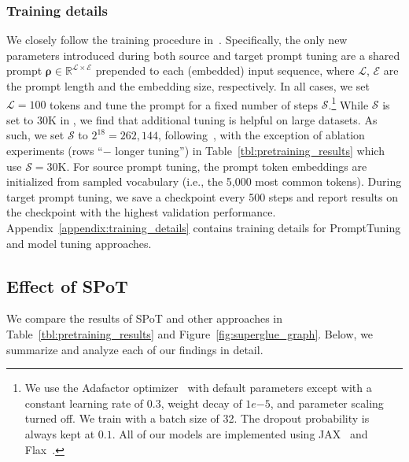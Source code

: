 \subsubsection{Training details}
\label{sec:training_details}
We closely follow the training procedure in~\citet{BLester21}. Specifically, the only new parameters introduced during both source and target prompt tuning are a shared prompt $\bm{\rho} \in \mathbb{R}^{\bm{\mathcal{L}} \times \bm{\mathcal{E}}}$ prepended to each (embedded) input sequence, where $\bm{\mathcal{L}}$, $\bm{\mathcal{E}}$ are the prompt length and the embedding size, respectively. In all cases, we set $\bm{\mathcal{L}} = 100$ tokens and tune the prompt for a fixed number of steps $\bm{\mathcal{S}}$.\footnote{We use the Adafactor optimizer~\cite{NShazeer18} with default parameters except with a constant learning rate of 0.3, weight decay of $1e{-5}$, and parameter scaling turned off. We train with a batch size of 32. The dropout probability is always kept at $0.1$. All of our models are implemented using {\scriptsize \sc JAX}~\cite{JBradbury18} and {\scriptsize \sc Flax}~\cite{JHeek20}.} While $\bm{\mathcal{S}}$ is set to 30K in \citet{BLester21}, we find that additional tuning is helpful on large datasets. As such, we set $\bm{\mathcal{S}}$ to $2^{18} = 262{,}144$, following~\citet{CRaffel20}, with the exception of ablation experiments (rows ``$-$ longer tuning'') in Table~\ref{tbl:pretraining_results} which use $\bm{\mathcal{S}}=30$K. For source prompt tuning, the prompt token embeddings are initialized from sampled vocabulary (i.e., the 5,000 most common tokens). During target prompt tuning, we save a checkpoint every 500 steps and report results on the checkpoint with the highest validation performance. 
Appendix~\ref{appendix:training_details} contains training details for {\small \sc PromptTuning} and model tuning approaches.
\subsection{Effect of {{\small \sc \textbf{SPoT}}}} We compare the results of {{\small \sc SPoT}} and other approaches in Table~\ref{tbl:pretraining_results} and Figure~\ref{fig:superglue_graph}. Below, we summarize and analyze each of our findings in detail.
